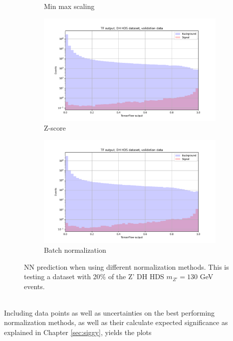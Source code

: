 \documentclass[12pt, a4paper]{book}
\begin{document}
\begin{figure}[!ht]
\begin{subfigure}[b]{0.49\textwidth}
      \caption{Min max scaling}
   \end{subfigure}
   \hfill
   \begin{subfigure}[b]{0.49\textwidth}
      \centering
      \includegraphics[width=1\textwidth]{Z_score/VAL_pre.pdf}
      \caption{Z-score}
   \end{subfigure}
   \hfill
   \begin{subfigure}[b]{0.49\textwidth}
      \centering
      \includegraphics[width=1\textwidth]{BatchNorm/VAL_pre.pdf}
      \caption{Batch normalization}
   \end{subfigure}
   \caption[Different normalization methods for NNs]{NN prediction when using different normalization methods. This is testing a dataset with 20\% of the Z' DH HDS $m_{Z'}=130$ GeV events.}\label{fig:DifferentNormalizations}
\end{figure}
\\Including data points as well as uncertainties on the best performing normalization methods, as well as their calculate expected significance as explained in Chapter \ref{sec:siggy}, yields the plots
\end{document}
